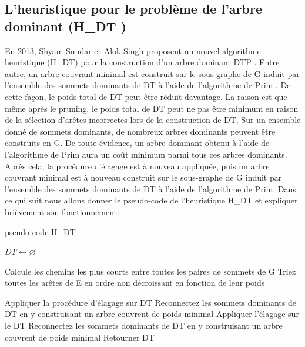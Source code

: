 \subsection{L’heuristique pour le problème de l’arbre dominant (H\_DT )}
En  2013, Shyam Sundar et Alok Singh proposent un nouvel algorithme heuristique (H\_DT) pour la construction d’un arbre dominant DTP \cite{sundar2013new}. Entre autre, un arbre couvrant minimal est construit sur le sous-graphe de G induit par l’ensemble des sommets dominants de DT à l’aide de l’algorithme de Prim \cite{prim1957shortest}. De cette façon, le poids total de DT peut être réduit davantage. La raison  est que même après le pruning, le poids total de DT peut ne pas être minimum en raison de la sélection d'arêtes incorrectes lors de la construction de DT. Sur un ensemble donné de sommets dominants, de nombreux arbres dominants peuvent être construits en G. De toute évidence, un arbre dominant obtenu à l’aide de l’algorithme de Prim aura un coût minimum parmi tous ces arbres dominants. Après cela, la procédure d’élagage est à nouveau appliquée, puis un arbre couvrant minimal est à nouveau construit sur le sous-graphe de G induit par l’ensemble des sommets dominants de DT à l’aide de l’algorithme de Prim. Dans ce qui suit nous allons donner le pseudo-code de l’heuristique H\_DT et expliquer brièvement son fonctionnement:

\begin{algorithm}[H]
\label{alg3:HDT}
\caption{ pseudo-code H\_DT}
\SetAlgoLined
\DontPrintSemicolon

$DT \gets \varnothing $  \;


Calcule les chemins les plus courts entre toutes les paires de sommets de G \;
Triez toutes les arêtes de E en ordre non décroissant en fonction de leur poids \;


Appliquer la procédure d'élagage sur DT \;
Reconnectez les sommets dominants de DT en y construisant un arbre couvrent de poids minimal \;
Appliquer l'élagage sur le DT \; 
Reconnectez les sommets dominants de DT en y construisant un arbre couvrent de poids minimal \;
Retourner DT \;
\end{algorithm}

